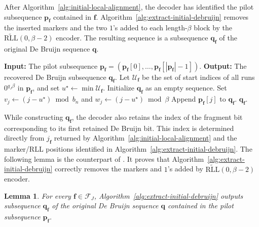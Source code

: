 \documentclass[journal,letterpaper,onecolumn,11pt]{IEEEtran}
\newcommand{\cF}{\mathcal{F}}
\newcommand{\cU}{\mathcal{U}}
\newcommand{\boldf}{\mathbf{f}}
\newcommand{\boldp}{\mathbf{p}}
\newcommand{\boldq}{\mathbf{q}}
\newtheorem{lemma}{Lemma}
\begin{document}
After Algorithm~\ref{alg:initial-local-alignment}, the decoder has identified
the pilot subsequence \(\boldp_{\boldf}\) contained in \(\boldf\). 
Algorithm~\ref{alg:extract-initial-debruijn} removes the inserted markers and the two \(1\)'s added to each
length-\(\beta\) block by the
\(\widetilde{\mathrm{RLL}}(0,\beta-2)\) encoder. The resulting sequence is
a subsequence \(\boldq_{\boldf}\) of the original De Bruijn sequence \(\boldq\). 

\begin{algorithm}[H]
\caption{Extraction of a De Bruijn subsequence}
\label{alg:extract-initial-debruijn}
\begin{algorithmic}[1]
\STATE \textbf{Input:} The pilot subsequence
\(\boldp_{\boldf}=(\boldp_{\boldf}[0],\ldots,\boldp_{\boldf}[|\boldp_{\boldf}|-1])\).
\STATE \textbf{Output:} The recovered De Bruijn subsequence
\(\boldq_{\boldf}\).
\STATE Let \(\cU_{\boldf}\) be the set of start indices of all runs
\(0^{q_J\beta}\) in \(\boldp_{\boldf}\), and set
\(u^\star\gets\min\cU_{\boldf}\).
\STATE Initialize \(\boldq_{\boldf}\) as an empty sequence.
\FOR{\(j=0\) to \(|\boldp_{\boldf}|-1\)}
    \STATE Set \(v_j\gets(j-u^\star)\bmod b_n\) and
    \(w_j\gets(j-u^\star)\bmod\beta\)
    \label{line:remove markers and rll added bits}
        \STATE Append \(\boldp_{\boldf}[j]\) to \(\boldq_{\boldf}\).
    \ENDIF
\ENDFOR
\RETURN \(\boldq_{\boldf}\).
\end{algorithmic}
\end{algorithm}
While constructing \(\boldq_{\boldf}\), the decoder also retains the
index of the fragment bit corresponding to its first retained De Bruijn
bit. This index is determined directly from \(j_{\boldf}\) returned by
Algorithm~\ref{alg:initial-local-alignment} and the marker/RLL positions identified in Algorithm~\ref{alg:extract-initial-debruijn}.
The following lemma is the counterpart of
\cite[Lemma~7]{liu2026improved}. It proves that  Algorithm~\ref{alg:extract-initial-debruijn}
correctly removes the markers and $1$'s added by \(\widetilde{\mathrm{RLL}}(0,\beta-2)\) encoder.

\begin{lemma}\label{lemma:extract-initial-debruijn-correct}
For every \(\boldf\in\cF_J\),
Algorithm~\ref{alg:extract-initial-debruijn} outputs 
subsequence \(\boldq_{\boldf}\) of the original De Bruijn sequence
\(\boldq\) contained in the pilot subsequence \(\boldp_{\boldf}\).
\end{lemma}
\end{document}
